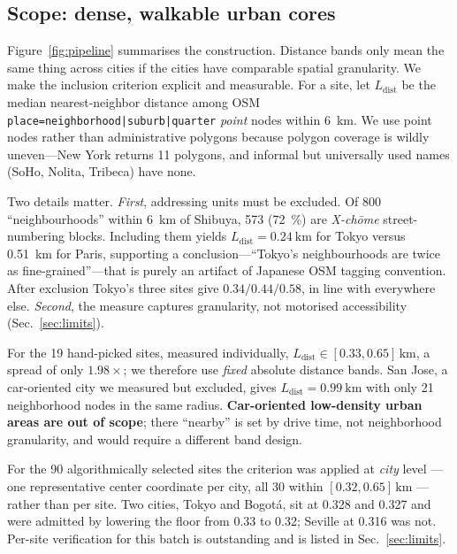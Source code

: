 \documentclass[10pt,a4paper]{article}
\newcommand{\Ldist}{\ensuremath{L_{\mathrm{dist}}}}
\begin{document}
\subsection{Scope: dense, walkable urban cores}
\label{sec:scope}

Figure~\ref{fig:pipeline} summarises the construction.
Distance bands only mean the same thing across cities if the cities have
comparable spatial granularity. We make the inclusion criterion explicit and
measurable. For a site, let \Ldist{} be the median nearest-neighbor distance
among OSM \texttt{place=neighborhood|suburb|quarter} \emph{point} nodes within
\SI{6}{\kilo\metre}. We use point nodes rather than administrative polygons
because polygon coverage is wildly uneven---New York returns \num{11} polygons,
and informal but universally used names (SoHo, Nolita, Tribeca) have none.

Two details matter.
\emph{First}, addressing units must be excluded. Of \num{800} ``neighbourhoods''
within \SI{6}{\kilo\metre} of Shibuya, \num{573} (\SI{72}{\percent}) are
\textit{X-chōme} street-numbering blocks. Including them yields
$\Ldist = \SI{0.24}{\kilo\metre}$ for Tokyo versus \SI{0.51}{\kilo\metre} for
Paris, supporting a conclusion---``Tokyo's neighbourhoods are twice as
fine-grained''---that is purely an artifact of Japanese OSM tagging convention.
After exclusion Tokyo's three sites give $0.34/0.44/0.58$, in line with
everywhere else.
\emph{Second}, the measure captures granularity, not motorised
accessibility (Sec.~\ref{sec:limits}).

For the \num{19} hand-picked sites, measured individually,
$\Ldist \in [0.33, 0.65]\,\si{\kilo\metre}$, a spread of only $1.98\times$; we
therefore use \emph{fixed} absolute distance bands. San Jose, a car-oriented
city we measured but excluded, gives $\Ldist = \SI{0.99}{\kilo\metre}$ with only
\num{21} neighborhood nodes in the same radius. \textbf{Car-oriented
low-density urban areas are out of scope}; there ``nearby'' is set by drive
time, not neighborhood granularity, and would require a different band design.

For the \num{90} algorithmically selected sites the criterion was applied at
\emph{city} level --- one representative center coordinate per city, all
\num{30} within $[0.32, 0.65]\,\si{\kilo\metre}$ --- rather than per site. Two
cities, Tokyo and Bogot\'a, sit at \num{0.328} and \num{0.327} and were admitted
by lowering the floor from \num{0.33} to \num{0.32}; Seville at \num{0.316} was
not. Per-site verification for this batch is outstanding and is listed in
Sec.~\ref{sec:limits}.
\end{document}
